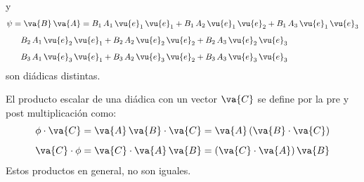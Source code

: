 y
\begin{align*}
\psi &= \va{B} \, \va{A} = B_{1} \, A_{1} \, \vu{e}_{1} \, \vu{e}_{1} + B_{1} \, A_{2} \, \vu{e}_{1} \, \vu{e}_{2} + B_{1} \, A_{3} \, \vu{e}_{1} \, \vu{e}_{3} \\[0.5em]
&{\quad} B_{2} \, A_{1} \, \vu{e}_{2} \, \vu{e}_{1} + B_{2} \, A_{2} \, \vu{e}_{2} \, \vu{e}_{2} + B_{2} \, A_{3} \, \vu{e}_{2} \, \vu{e}_{3} \\[0.5em]
&{\quad} B_{3} \, A_{1} \, \vu{e}_{3} \, \vu{e}_{1} + B_{3} \, A_{2} \, \vu{e}_{3} \, \vu{e}_{2} + B_{3} \, A_{3} \, \vu{e}_{3} \, \vu{e}_{3}
\end{align*}
son diádicas distintas.
\par
El producto escalar de una diádica con un vector $\va{C}$ se define por la pre y post multiplicación como:
\begin{align*}
\phi \cdot \va{C} &= \va{A} \, \va{B} \cdot \va{C} = \va{A} \, (\va{B} \cdot \va{C}) \\[0.5em]
\va{C} \cdot \phi &= \va{C} \cdot \va{A} \, \va{B} = (\va{C} \cdot \va{A}) \, \va{B}
\end{align*}
Estos productos en general, no son iguales.
